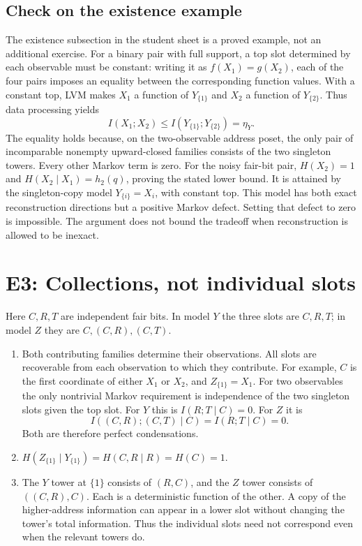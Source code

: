 \documentclass[11pt]{article}
\begin{document}
\subsection{Check on the existence example}
The existence subsection in the student sheet is a proved example, not an
additional exercise. For a binary pair with full support, a top slot determined
by each observable must be constant: writing it as $f(X_1)=g(X_2)$, each of the
four pairs imposes an equality between the corresponding function values.
With a constant top, LVM makes $X_1$ a function of
$Y_{\{1\}}$ and $X_2$ a function of $Y_{\{2\}}$. Thus data processing yields
\[
 I(X_1;X_2)\le I(Y_{\{1\}};Y_{\{2\}})=\eta_Y.
\]
The equality holds because, on the two-observable address poset, the only
pair of incomparable nonempty upward-closed families consists of the two
singleton towers. Every other Markov term is zero. For the noisy fair-bit
pair, $H(X_2)=1$ and $H(X_2\mid X_1)=h_2(q)$, proving the stated lower bound.
It is attained by the singleton-copy model $Y_{\{i\}}=X_i$, with constant top.
This model has both exact reconstruction directions but a positive Markov
defect. Setting that defect to zero is impossible. The argument does not bound
the tradeoff when reconstruction is allowed to be inexact.

\section{E3: Collections, not individual slots}
\label{sec:e3}
Here $C,R,T$ are independent fair bits. In model $Y$ the three slots are
$C,R,T$; in model $Z$ they are $C,(C,R),(C,T)$.
\begin{enumerate}[label=(\alph*)]
\item Both contributing families determine their observations. All slots are
recoverable from each observation to which they contribute. For example,
$C$ is the first coordinate of either $X_1$ or $X_2$, and $Z_{\{1\}}=X_1$.
For two observables the only nontrivial Markov requirement is independence of
the two singleton slots given the top slot. For $Y$ this is
$I(R;T\mid C)=0$. For $Z$ it is
\[
 I((C,R);(C,T)\mid C)=I(R;T\mid C)=0.
\]
Both are therefore perfect condensations.
\item $H(Z_{\{1\}}\mid Y_{\{1\}})=H(C,R\mid R)=H(C)=1$.
\item The $Y$ tower at $\{1\}$ consists of $(R,C)$, and the $Z$ tower
consists of $((C,R),C)$. Each is a deterministic function of the other. A copy
of the higher-address information can appear in a lower slot without changing
the tower's total information. Thus the individual slots need not correspond
even when the relevant towers do.
\end{enumerate}
\end{document}
